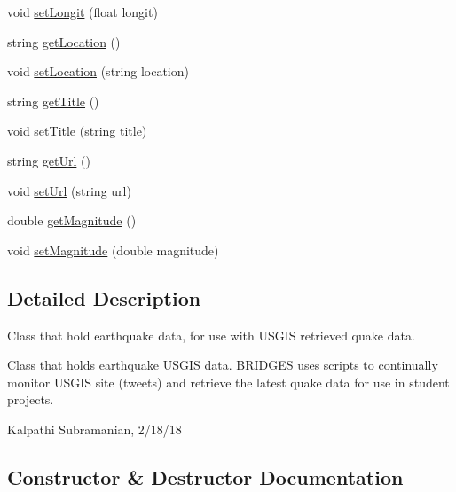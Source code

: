 \begin{DoxyCompactItemize}
\item 
void \mbox{\hyperlink{classbridges_1_1_earthquake_u_s_g_s_a745dc27f3c68a3ae996ceb7771d89ec5}{set\+Longit}} (float longit)
\item 
string \mbox{\hyperlink{classbridges_1_1_earthquake_u_s_g_s_aa04c172c5c77bd2f88b1dd319130b9eb}{get\+Location}} ()
\item 
void \mbox{\hyperlink{classbridges_1_1_earthquake_u_s_g_s_a5dc533759cc900440d70bdfc68f16599}{set\+Location}} (string location)
\item 
string \mbox{\hyperlink{classbridges_1_1_earthquake_u_s_g_s_a6b8e10f1a092c8884428cecbd1defb19}{get\+Title}} ()
\item 
void \mbox{\hyperlink{classbridges_1_1_earthquake_u_s_g_s_a78fe86dcb1bae8470d5ac58fdda2fe51}{set\+Title}} (string title)
\item 
string \mbox{\hyperlink{classbridges_1_1_earthquake_u_s_g_s_a60961cae033becb6144c883a7a984f86}{get\+Url}} ()
\item 
void \mbox{\hyperlink{classbridges_1_1_earthquake_u_s_g_s_ac07298c50e03955d167a2ca38c5150be}{set\+Url}} (string url)
\item 
double \mbox{\hyperlink{classbridges_1_1_earthquake_u_s_g_s_a51659fac2236aaaa03d2921fd7c1fcf9}{get\+Magnitude}} ()
\item 
void \mbox{\hyperlink{classbridges_1_1_earthquake_u_s_g_s_aae8be6112f5c27c168c452261d9b29a2}{set\+Magnitude}} (double magnitude)
\end{DoxyCompactItemize}


\subsection{Detailed Description}
Class that hold earthquake data, for use with U\+S\+G\+IS retrieved quake data. 

Class that holds earthquake U\+S\+G\+IS data. B\+R\+I\+D\+G\+ES uses scripts to continually monitor U\+S\+G\+IS site (tweets) and retrieve the latest quake data for use in student projects.

Kalpathi Subramanian, 2/18/18 

\subsection{Constructor \& Destructor Documentation}
\mbox{\label{classbridges_1_1_earthquake_u_s_g_s_a540ae74c248da179fbbd182b843a14e0}} 
